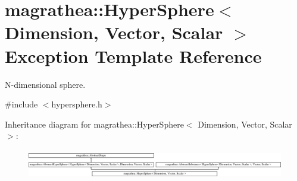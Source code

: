 \hypertarget{exceptionmagrathea_1_1HyperSphere}{\section{magrathea\-:\-:Hyper\-Sphere$<$ Dimension, Vector, Scalar $>$ Exception Template Reference}
\label{exceptionmagrathea_1_1HyperSphere}
}


N-\/dimensional sphere.  




{\ttfamily \#include $<$hypersphere.\-h$>$}

Inheritance diagram for magrathea\-:\-:Hyper\-Sphere$<$ Dimension, Vector, Scalar $>$\-:\begin{figure}[H]
\begin{center}
\leavevmode
\includegraphics[height=1.306376cm]{exceptionmagrathea_1_1HyperSphere}
\end{center}
\end{figure}
